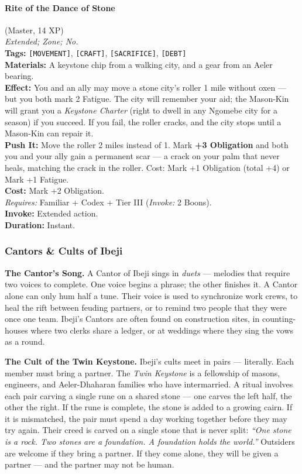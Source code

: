 \paragraph{Rite of the Dance of Stone} (Master, 14 XP) \hfill \\
\emph{Extended; Zone; No.} \\
\textbf{Tags:} \texttt{[MOVEMENT]}, \texttt{[CRAFT]}, \texttt{[SACRIFICE]}, \texttt{[DEBT]} \\
\textbf{Materials:} A keystone chip from a walking city, and a gear from an Aeler bearing. \\
\textbf{Effect:} You and an ally may move a stone city's roller 1 mile without oxen --- but you both mark 2 Fatigue. The city will remember your aid; the Mason-Kin will grant you a \textit{Keystone Charter} (right to dwell in any Ngomebe city for a season) if you succeed. If you fail, the roller cracks, and the city stops until a Mason-Kin can repair it. \\
\textbf{Push It:} Move the roller 2 miles instead of 1. Mark \textbf{+3 Obligation} and both you and your ally gain a permanent scar --- a crack on your palm that never heals, matching the crack in the roller. Cost: Mark +1 Obligation (total +4) or Mark +1 Fatigue. \\
\textbf{Cost:} Mark +2 Obligation. \\
\textit{Requires:} Familiar + Codex + Tier III (\textit{Invoke:} 2 Boons). \\
\textbf{Invoke:} Extended action. \\
\textbf{Duration:} Instant.

\subsubsection*{Cantors \& Cults of Ibeji}

\textbf{The Cantor's Song.} A Cantor of Ibeji sings in \textit{duets} --- melodies that require two voices to complete. One voice begins a phrase; the other finishes it. A Cantor alone can only hum half a tune. Their voice is used to synchronize work crews, to heal the rift between feuding partners, or to remind two people that they were once one team. Ibeji's Cantors are often found on construction sites, in counting-houses where two clerks share a ledger, or at weddings where they sing the vows as a round.

\textbf{The Cult of the Twin Keystone.} Ibeji's cults meet in pairs --- literally. Each member must bring a partner. The \textit{Twin Keystone} is a fellowship of masons, engineers, and Aeler-Dhaharan families who have intermarried. A ritual involves each pair carving a single rune on a shared stone --- one carves the left half, the other the right. If the rune is complete, the stone is added to a growing cairn. If it is mismatched, the pair must spend a day working together before they may try again. Their creed is carved on a single stone that is never split: \textit{``One stone is a rock. Two stones are a foundation. A foundation holds the world.''} Outsiders are welcome if they bring a partner. If they come alone, they will be given a partner --- and the partner may not be human.

